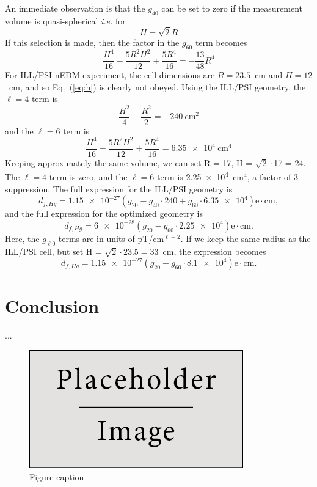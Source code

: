 \documentclass[preprint,12pt]{elsarticle}
\begin{document}
An immediate observation is that the $g_{40}$ can be set to zero if
the measurement volume is quasi-spherical {\it i.e.} for
\begin{equation}
\label{eq:h}
H=\sqrt{2}R
\end{equation}
If this selection is made, then the factor in the $g_{60}$ term becomes
\begin{equation}
\frac{H^{4}}{16}-\frac{5R^2H^2}{12}+\frac{5R^4}{16}=-\frac{13}{48}R^4
\end{equation}
For ILL/PSI nEDM experiment, the cell dimensions are $R=23.5$~cm and
$H=12$~cm, and so Eq.~(\ref{eq:h}) is clearly not obeyed.
Using the ILL/PSI geometry, the $\ell=4$ term is
\begin{equation}
\frac{H^{2}}{4}-\frac{R^2}{2}=-240~\mathrm{cm}^2
\end{equation}
and the $\ell=6$ term is
\begin{equation}
\frac{H^{4}}{16}-\frac{5R^2H^2}{12}+\frac{5R^4}{16}=\num{6.35e4}~\mathrm{cm}^4
\end{equation}
Keeping approximately the same volume, we can set R = 17, H =
$\sqrt{2}\cdot$17 = 24.  The $\ell=4$ term is zero, and the $\ell=6$
term is \num{2.25e4}~cm$^4$, a factor of 3 suppression.
The full expression for the ILL/PSI geometry is
\begin{equation}
d_{f,Hg} = \num{1.15e-27}\left(g_{20} - g_{40}\cdot240 + g_{60}\cdot\num{6.35e4}\right)\mathrm{e}\cdot\mathrm{cm},
\end{equation}
and the full expression for the optimized geometry is
\begin{equation}
d_{f,Hg} = \num{6e-28}\left(g_{20} - g_{60}\cdot\num{2.25e4}\right)\mathrm{e}\cdot\mathrm{cm}.
\end{equation}
Here, the $g_{\ell0}$ terms are in units of pT/cm$^{\ell-2}$.  If we keep the same radius as the ILL/PSI cell, but set H = $\sqrt{2}\cdot23.5=33$~cm, the expression becomes
\begin{equation}
d_{f,Hg}=\num{1.15e-27}(g_{20}-g_{60}\cdot\num{8.1e4})\mathrm{e}\cdot\mathrm{cm}.
\end{equation}
\section{Conclusion}

...


\begin{figure}[h]
\centering\includegraphics[width=0.4\linewidth]{placeholder}
\caption{Figure caption}
\end{figure}
\end{document}
